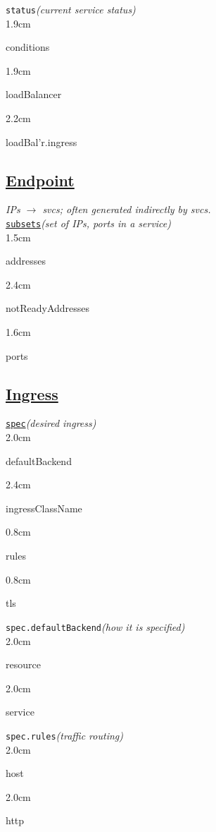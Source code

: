 \texttt{status}\quad\textit{(current service status)}\\[-2mm]
\api
{1.9cm}{
conditions      

}
{1.9cm}{
loadBalancer    

}
{2.2cm}{
loadBal'r.ingress

}
\stopapi



\subsection*{\href{https://kubernetes.io/docs/concepts/services-networking/endpoint-slices/}{Endpoint}}
\textit{IPs $\to$  svcs; often generated indirectly by svcs.}\\
\texttt{\href{https://kubernetes.io/docs/reference/kubernetes-api/service-resources/endpoints-v1/}{subsets}}\quad\textit{(set of IPs, ports in a service)}\\[-2mm]
\api
{1.5cm}{
addresses       

}
{2.4cm}{
notReadyAddresses  

}
{1.6cm}{
ports   

}
\stopapi




\subsection*{\href{https://kubernetes.io/docs/concepts/services-networking/ingress/}{Ingress}}


\texttt{\href{https://kubernetes.io/docs/reference/kubernetes-api/service-resources/ingress-v1/}{spec}}\quad\textit{(desired ingress)}\\[-2mm]
\api
{2.0cm}{
defaultBackend      

}
{2.4cm}{
ingressClassName    

}
{0.8cm}{
rules               

}
{0.8cm}{
tls

}
\stopapi


\texttt{spec.defaultBackend}\quad\textit{(how it is specified)}\\[-2mm]
\api
{2.0cm}{
resource

}
{2.0cm}{
service

}
\stopapi


\texttt{spec.rules}\quad\textit{(traffic routing)}\\[-2mm]
\api
{2.0cm}{
host

}
{2.0cm}{
http

}
\stopapi



